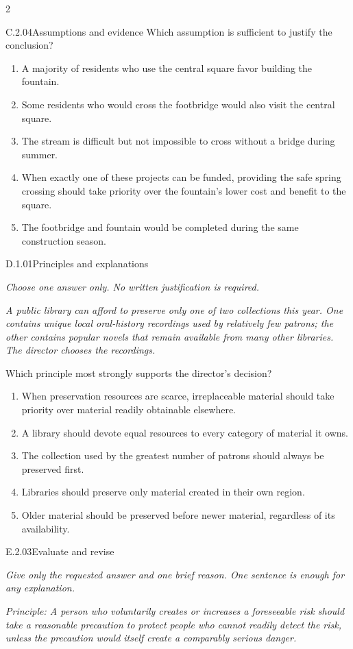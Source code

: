 \documentclass[9pt]{extarticle}
\newcommand{\choice}[1]{\item #1}
\begin{document}
\begin{multicols}{2}
\begin{DenseCoreProblem}{C.2.04}{Assumptions and evidence}
Which assumption is sufficient to justify the conclusion?
\begin{enumerate}[label=(\alph*)]
  \choice{A majority of residents who use the central square favor building the fountain.}
  \choice{Some residents who would cross the footbridge would also visit the central square.}
  \choice{The stream is difficult but not impossible to cross without a bridge during summer.}
  \choice{When exactly one of these projects can be funded, providing the safe spring crossing should take priority over the fountain's lower cost and benefit to the square.}
  \choice{The footbridge and fountain would be completed during the same construction season.}
\end{enumerate}
\end{DenseCoreProblem}
\begin{DenseCoreProblem}{D.1.01}{Principles and explanations}
{\scriptsize\textit{Choose one answer only. No written justification is required.}\par}
\emph{A public library can afford to preserve only one of two collections this year. One contains unique local oral-history recordings used by relatively few patrons; the other contains popular novels that remain available from many other libraries. The director chooses the recordings.}

Which principle most strongly supports the director's decision?
\begin{enumerate}[label=(\alph*)]
  \choice{When preservation resources are scarce, irreplaceable material should take priority over material readily obtainable elsewhere.}
  \choice{A library should devote equal resources to every category of material it owns.}
  \choice{The collection used by the greatest number of patrons should always be preserved first.}
  \choice{Libraries should preserve only material created in their own region.}
  \choice{Older material should be preserved before newer material, regardless of its availability.}
\end{enumerate}
\end{DenseCoreProblem}
\begin{DenseCoreProblem}{E.2.03}{Evaluate and revise}
{\scriptsize\textit{Give only the requested answer and one brief reason. One sentence is enough for any explanation.}\par}
\emph{Principle: A person who voluntarily creates or increases a foreseeable risk should take a reasonable precaution to protect people who cannot readily detect the risk, unless the precaution would itself create a comparably serious danger.}


\end{DenseCoreProblem}
\end{multicols}
\end{document}
